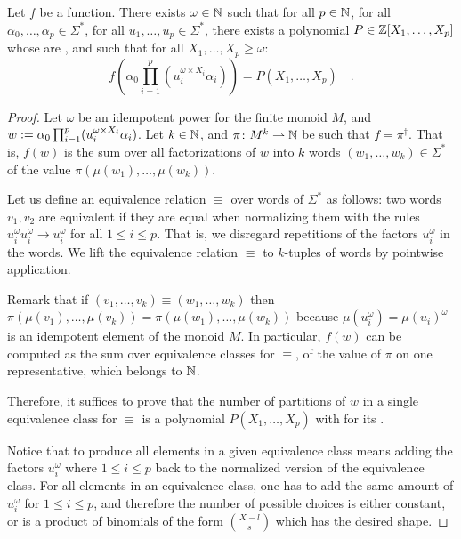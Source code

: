 \begin{lemma}
    \label{n-poly-combinatorics:lem}
    Let $f$ be a   function. 
    There exists $\omega \in \mathbb{N}$
    such that for all $p \in \mathbb{N}$,
    for all $\alpha_0, \dots, \alpha_p \in \Sigma^*$,
    for all $u_1, \dots, u_p \in \Sigma^*$,
    there exists a polynomial $P \in \mathbb{Z}[X_1, \dots, X_p]$
    whose  are ,
    and such that for all $X_1, \dots, X_p \geq \omega$:
    \begin{equation*}
        f\left(
            \alpha_0 \prod_{i = 1}^p (u_i^{\omega \times X_i} \alpha_i)
        \right)
        = P(X_1, \dots, X_p) \quad .
    \end{equation*}
\end{lemma}
\begin{proof}
    Let $\omega$ be an idempotent power for the finite monoid $M$,
    and
    $w \mathrel{:=} \alpha_0 \prod_{i = 1}^p (u_i^{\omega \times X_i} \alpha_i)$.
    Let $k \in \mathbb{N}$, and $\pi \colon M^k \rightharpoonup \mathbb{N}$ be such that
    $f = \pi^\dagger$. That is, 
    $f(w)$ is the sum over all factorizations of $w$
    into $k$ words $(w_1, \dots, w_k) \in \Sigma^*$
    of the value $\pi(\mu(w_1), \dots, \mu(w_k))$.

    Let us define an equivalence relation $\equiv$ over words of
    $\Sigma^*$ as follows: two words $v_1, v_2$ are equivalent if they are
    equal when normalizing them with the rules $u_i^{\omega} u_i^{\omega} \to
    u_i^{\omega}$ for all $1 \leq i \leq p$. That is, we disregard
    repetitions of the factors $u_i^{\omega}$ in the words.
    We lift the equivalence relation $\equiv$ to $k$-tuples of
    words by pointwise application.

    Remark that if $(v_1, \dots, v_k) \equiv (w_1, \dots, w_k)$ then
    $\pi(\mu(v_1), \dots, \mu(v_k)) = \pi(\mu(w_1), \dots, \mu(w_k))$ because
    $\mu(u_i^\omega) = \mu(u_i)^\omega$ is an idempotent element of the monoid
    $M$. In particular, $f(w)$ can be computed as the sum over equivalence
    classes for $\equiv$, of the value of $\pi$ on one representative,
    which belongs to $\mathbb{N}$.

    Therefore, it suffices to prove that the number of partitions of $w$ in a
    single equivalence class for $\equiv$ is a polynomial $P(X_1, \dots, X_p)$
    with  for its .

    Notice that to produce all elements in a given equivalence class
    means adding the factors $u_i^\omega$ where $1 \leq i \leq p$
    back to the normalized version
    of the equivalence class. For all elements in an equivalence class,
    one has to add the same amount of $u_i^\omega$ for $1 \leq i \leq p$,
    and therefore the number of possible choices
    is either constant, or 
    is a product of binomials of the form $\binom{X - l}{s}$
    which has the desired shape.
\end{proof}


